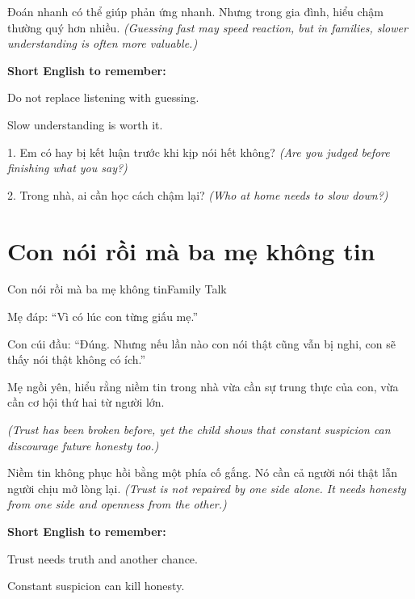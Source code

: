 \begin{baihoc}
Đoán nhanh có thể giúp phản ứng nhanh. Nhưng trong gia đình, hiểu chậm thường quý hơn nhiều.
\textit{(Guessing fast may speed reaction, but in families, slower understanding is often more valuable.)}
\end{baihoc}

\begin{ghinhoanh}
\textbf{Short English to remember:}

Do not replace listening with guessing.

Slow understanding is worth it.
\end{ghinhoanh}

\begin{tuhocnhanh}
1. Em có hay bị kết luận trước khi kịp nói hết không? \textit{(Are you judged before finishing what you say?)}

2. Trong nhà, ai cần học cách chậm lại? \textit{(Who at home needs to slow down?)}
\end{tuhocnhanh}
\ngancach

\section{Con nói rồi mà ba mẹ không tin}
\begin{truyen}{Con nói rồi mà ba mẹ không tin}{Family Talk}

Mẹ đáp: ``Vì có lúc con từng giấu mẹ.''

Con cúi đầu: ``Đúng. Nhưng nếu lần nào con nói thật cũng vẫn bị nghi, con sẽ thấy nói thật không có ích.''

Mẹ ngồi yên, hiểu rằng niềm tin trong nhà vừa cần sự trung thực của con, vừa cần cơ hội thứ hai từ người lớn.

\textit{(Trust has been broken before, yet the child shows that constant suspicion can discourage future honesty too.)}
\end{truyen}

\begin{baihoc}
Niềm tin không phục hồi bằng một phía cố gắng. Nó cần cả người nói thật lẫn người chịu mở lòng lại.
\textit{(Trust is not repaired by one side alone. It needs honesty from one side and openness from the other.)}
\end{baihoc}

\begin{ghinhoanh}
\textbf{Short English to remember:}

Trust needs truth and another chance.

Constant suspicion can kill honesty.
\end{ghinhoanh}

